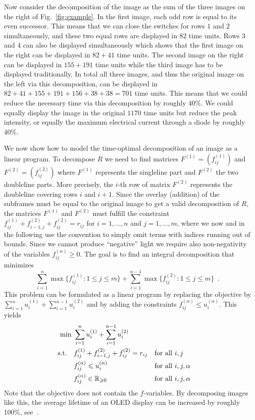\noindent Now consider the decomposition of the image as the sum of the three
images on the right of Fig.~\ref{fig:example}. In the first image, each
odd row is equal to its even successor. This means that we can close
the switches for rows $1$ and $2$ simultaneously, and these two equal
rows are displayed in $82$ time units.  Rows $3$ and $4$ can also be
displayed simultaneously which shows that the first image on the right
can be displayed in $82+41$ time units. The second image on the right
can be displayed in $155+191$ time units while the third image has to
be displayed traditionally. In total all three images, and thus the
original image on the left via this decomposition, can be displayed in
$82+41+155+191+156+38+38=701$ time units. This means that we could
reduce the necessary time via this decomposition by roughly
$40\%$. We could equally display the image in the original $1170$ time
units but reduce the peak intensity, or equally the maximum electrical current
through a diode by roughly $40\%$.


We now show how to model the time-optimal decomposition of an image as
a linear program. 
To decompose $R$ we need to find matrices
$F^{(1)}=(f_{ij}^{(1)})$ and $F^{(2)}=(f_{ij}^{(2)})$ where $F^{(1)}$
represents the singleline part and $F^{(2)}$ the two doubleline parts.
More precisely, the $i$-th row of matrix $F^{(2)}$ represents the
doubleline covering rows $i$ and $i+1$.  Since the overlay (addition)
of the subframes must be equal to the original image to get a valid
decomposition of $R$, the matrices $F^{(1)}$ and $F^{(2)}$ must
fulfill the constraint $f^{(1)}_{ij} + f^{(2)}_{i-1,j} +
f^{(2)}_{ij}=r_{ij}$ for $i=1,\dots,n$ and $j=1,\dots,m$, where we now
and in the following use the convention to simply omit terms with
indices running out of bounds.  Since we cannot produce ``negative''
light we require also non-negativity of the variables
$f^{(\alpha)}_{ij}\geq0$.  The goal is to find an integral decomposition
that minimizes
\begin{equation*}
\sum_{i=1}^n \max \{ f^{(1)}_{ij}: 1 \leq j \leq m \} + \sum_{i=1}^{n-1} \max \{
f^{(2)}_{ij}: 1 \leq j \leq m \}\enspace.
\end{equation*}
This problem can be formulated as a  linear program by
replacing the objective by $\sum_{i=1}^n u^{(1)}_i +
\sum_{i=1}^{n-1}u^{(2)}_i$ and by adding the constraints $ f^{(\alpha)}_{ij} \leq
u^{(\alpha)}_i$.  This yields
\begin{align}
  \min~ & \sum_{i=1}^n u^{(1)}_i+\sum_{i=1}^{n-1}u^{(2)}_i\nonumber\\
  \text{s.t.}\quad & f^{(1)}_{ij} + f^{(2)}_{i-1,j} + f^{(2)}_{ij} = r_{ij}
  &&\text{for all $i,j$}\label{eqn:original}\\
  & f^{(\alpha)}_{ij} \leqslant u^{(\alpha)}_i
  &&\text{for all $i,j,\alpha$}\\
   & f^{(\alpha)}_{ij} \in\mathbb{R}_{\geqslant 0}
  &&\text{for all $i,j,\alpha$} \nonumber\nonumber
\end{align}
%
Note that the objective does not contain the $f$-variables. By
decomposing images like this, the average lifetime of an OLED display
can be increased by roughly 100\%, see~\cite{EKX07}. 


